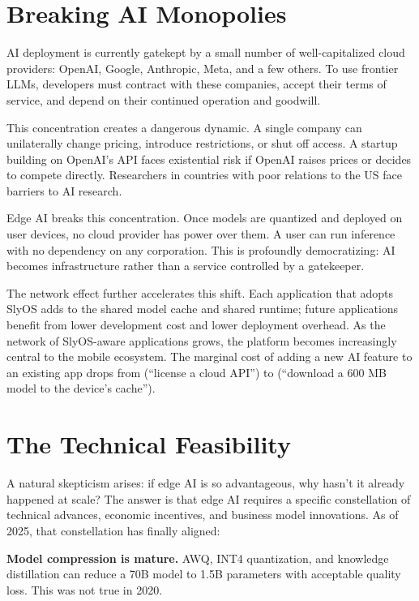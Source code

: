 \documentclass[12pt, letterpaper, twoside]{report}
\begin{document}
\section{Breaking AI Monopolies}
\label{sec:ai_democratization}

AI deployment is currently gatekept by a small number of well-capitalized cloud providers: OpenAI, Google, Anthropic, Meta, and a few others. To use frontier LLMs, developers must contract with these companies, accept their terms of service, and depend on their continued operation and goodwill.

This concentration creates a dangerous dynamic. A single company can unilaterally change pricing, introduce restrictions, or shut off access. A startup building on OpenAI's API faces existential risk if OpenAI raises prices or decides to compete directly. Researchers in countries with poor relations to the US face barriers to AI research.

Edge AI breaks this concentration. Once models are quantized and deployed on user devices, no cloud provider has power over them. A user can run inference with no dependency on any corporation. This is profoundly democratizing: AI becomes infrastructure rather than a service controlled by a gatekeeper.

The network effect further accelerates this shift. Each application that adopts SlyOS adds to the shared model cache and shared runtime; future applications benefit from lower development cost and lower deployment overhead. As the network of SlyOS-aware applications grows, the platform becomes increasingly central to the mobile ecosystem. The marginal cost of adding a new AI feature to an existing app drops from (``license a cloud API'') to (``download a 600 MB model to the device's cache'').

\section{The Technical Feasibility}
\label{sec:feasibility}

A natural skepticism arises: if edge AI is so advantageous, why hasn't it already happened at scale? The answer is that edge AI requires a specific constellation of technical advances, economic incentives, and business model innovations. As of 2025, that constellation has finally aligned:

\textbf{Model compression is mature.} AWQ, INT4 quantization, and knowledge distillation can reduce a 70B model to 1.5B parameters with acceptable quality loss. This was not true in 2020.
\end{document}
